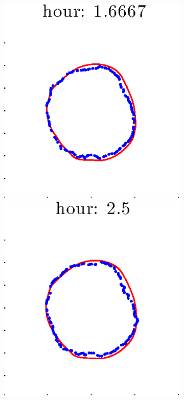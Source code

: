 \documentclass[12pt]{article}
\begin{document}
\begin{figure}[h!]
\begin{subfigure}[b]{.3\textwidth}
		\includegraphics[height=.15\textheight]{Pos0/firsthalf/first3.eps}
		\includegraphics[height=.15\textheight]{Pos0/firsthalf/first4.eps}

\end{subfigure}
\end{figure}
\end{document}
